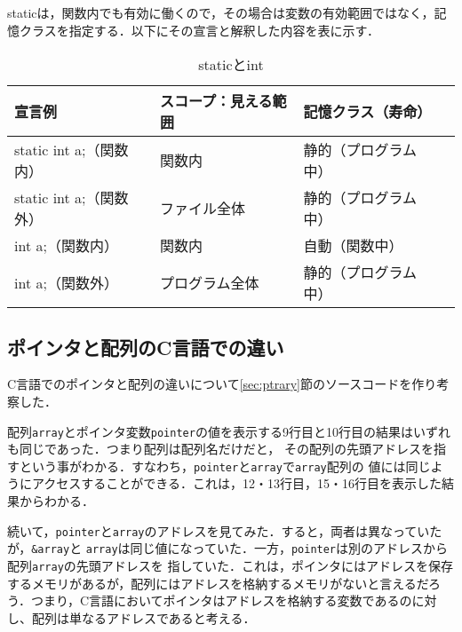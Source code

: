 \documentclass[a4j,11pt]{jarticle}
\begin{document}
staticは，関数内でも有効に働くので，その場合は変数の有効範囲ではなく，記憶クラスを指定する．以下にその宣言と解釈した内容を表に示す．
\begin{table}[htb]
  \caption{staticとint}
  \label{tab:table1}
  \centering
  \begin{tabular}{|l|l|l|l|}
  \hline
  宣言例                & スコープ：見える範囲 & 記憶クラス（寿命）  \\ \hline
  static int a;（関数内） & 関数内        & 静的（プログラム中） \\ \hline
  static int a;（関数外） & ファイル全体     & 静的（プログラム中） \\ \hline
  int a;（関数内）        & 関数内        & 自動（関数中）    \\ \hline
  int a;（関数外）        & プログラム全体    & 静的（プログラム中） \\ \hline
  \end{tabular}
  \end{table}

\subsection{ポインタと配列のC言語での違い}
C言語でのポインタと配列の違いについて\ref{sec:ptrary}節のソースコードを作り考察した．

配列\verb|array|とポインタ変数\verb|pointer|の値を表示する9行目と10行目の結果はいずれも同じであった．つまり配列は配列名だけだと，
その配列の先頭アドレスを指すという事がわかる．すなわち，\verb|pointer|と\verb|array|で\verb|array|配列の
値には同じようにアクセスすることができる．これは，12・13行目，15・16行目を表示した結果からわかる．

続いて，\verb|pointer|と\verb|array|のアドレスを見てみた．すると，両者は異なっていたが，\verb|&array|と
\verb|array|は同じ値になっていた．一方，\verb|pointer|は別のアドレスから配列\verb|array|の先頭アドレスを
指していた．これは，ポインタにはアドレスを保存するメモリがあるが，配列にはアドレスを格納するメモリがないと言えるだろう．つまり，C言語においてポインタはアドレスを格納する変数であるのに対し、配列は単なるアドレスであると考える．
\end{document}
